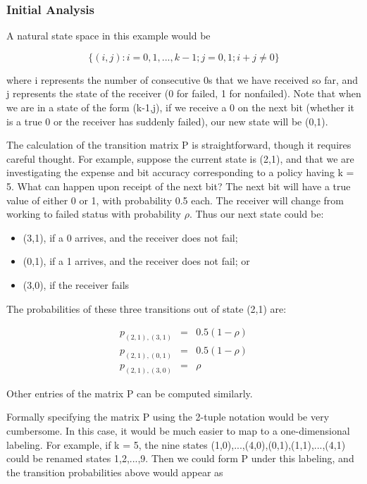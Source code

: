 \documentclass[11pt]{article}
\begin{document}
\subsubsection{Initial Analysis}

A natural state space in this example would be

\begin{equation}
\{(i,j):i=0,1,...,k-1;j=0,1;i+j\neq 0\}
\end{equation}

where i represents the number of consecutive 0s that we have received so
far, and j represents the state of the receiver (0 for failed, 1 for
nonfailed).  Note that when we are in a state of the form (k-1,j), if we
receive a 0 on the next bit (whether it is a true 0 or the receiver has
suddenly failed), our new state will be (0,1).

The calculation of the transition matrix P is straightforward, though it
requires careful thought.  For example, suppose the current state is
(2,1), and that we are investigating the expense and bit accuracy
corresponding to a policy having k = 5. What can happen upon receipt of
the next bit? The next bit will have a true value of either 0 or 1, with
probability 0.5 each. The receiver will change from working to failed
status with probability $\rho$. Thus our next state could be:

\begin{itemize}

\item (3,1), if a 0 arrives, and the receiver does not fail; 

\item (0,1), if a 1 arrives, and the receiver does not fail; or 

\item (3,0), if the receiver fails 

\end{itemize}

The probabilities of these three transitions out of state (2,1) are:

\begin{eqnarray}
p_{(2,1),(3,1)} & = & 0.5(1-\rho ) \\
p_{(2,1),(0,1)} & = & 0.5(1-\rho ) \\  
p_{(2,1),(3,0)} & = & \rho 
\end{eqnarray}  

Other entries of the matrix P can be computed similarly.

Formally specifying the matrix P using the 2-tuple notation would be
very cumbersome.  In this case, it would be much easier to map to a
one-dimensional labeling.  For example, if k = 5, the nine states
(1,0),...,(4,0),(0,1),(1,1),...,(4,1) could be renamed states 1,2,...,9.
Then we could form P under this labeling, and the transition
probabilities above would appear as
\end{document}
